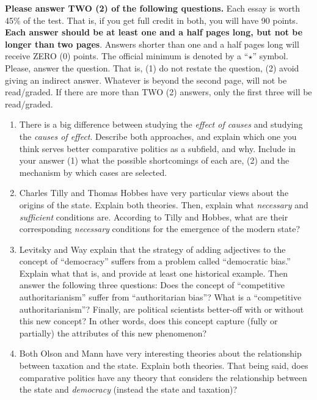 \documentclass{article}
\begin{document}
{\bf Please answer TWO (2) of the following questions.} Each essay is worth 45\% of the test. That is, if you get full credit in both, you will have 90 points. {\bf Each answer should be at least one and a half pages long, but not be longer than two pages}. Answers shorter than one and a half pages long will receive ZERO (0) points. The official minimum is denoted by a ``$\star$'' symbol. Please, answer the question. That is, (1) do not restate the question, (2) avoid giving an indirect answer. Whatever is beyond the second page, will not be read/graded. If there are more than TWO (2) answers, only the first three will be read/graded.


\begin{enumerate}
    \item There is a big difference between studying the \emph{effect of causes} and studying the \emph{causes of effect}. Describe both approaches, and explain which one you think serves better comparative politics as a subfield, and why. Include in your answer (1) what the possible shortcomings of each are, (2) and the mechanism by which cases are selected.
    
    \item Charles Tilly and Thomas Hobbes have very particular views about the origins of the state. Explain both theories. Then, explain what \emph{necessary} and \emph{sufficient} conditions are. According to Tilly and Hobbes, what are their corresponding \emph{necessary} conditions for the emergence of the modern state?
    
    
    \item Levitsky and Way explain that the strategy of adding adjectives to the concept of ``democracy'' suffers from a problem called ``democratic bias.'' Explain what that is, and provide at least one historical example. Then answer the following three questions: Does the concept of ``competitive authoritarianism'' suffer from ``authoritarian bias''?  What is a ``competitive authoritarianism''? Finally, are political scientists  better-off with or without this new concept? In other words, does this concept capture (fully or partially) the attributes of this new phenomenon?
    
    \item Both Olson and Mann have very interesting theories about the relationship between taxation and the state. Explain both theories. That being said, does comparative politics have any theory that considers the relationship between the state and \emph{democracy} (instead the state and taxation)?

\end{enumerate}
\end{document}
